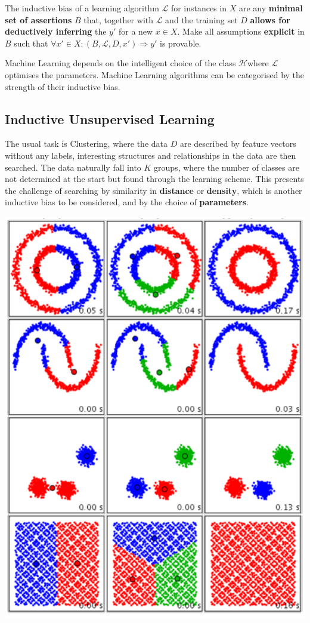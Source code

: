 \documentclass[11pt]{article}
\theoremstyle{definition}
\newcommand*\Hilbert{\ensuremath{\mathcal{H}}}
\begin{document}
The inductive bias of a learning algorithm $\mathcal{L}$ for instances in $X$ are any \textbf{minimal set of assertions} $B$ that, together with $\mathcal{L}$ and the training set $D$ \textbf{allows for deductively inferring} the $y'$ for a new $x\in X$. Make all assumptions \textbf{explicit} in $B$ such that $\forall x' \in X: \left(B, \mathcal{L}, D, x' \right) \Rightarrow y'$ is provable.

Machine Learning depends on the intelligent choice of the class \Hilbert where $\mathcal{L}$ optimises the parameters. Machine Learning algorithms can be categorised by the strength of their inductive bias.

\subsection{Inductive Unsupervised Learning}
\begin{minipage}{0.6\linewidth}
	The usual task is Clustering, where the data $D$ are described by feature vectors without any labels, interesting structures and relationships in the data are then searched. The data naturally fall into $K$ groups, where the number of classes are not determined at the start but found through the learning scheme. This presents the challenge of searching by similarity in \textbf{distance} or \textbf{density}, which is another inductive bias to be considered, and by the choice of \textbf{parameters}.
	
\end{minipage}
\begin{minipage}{0.4\linewidth}
	\begin{center}
		\includegraphics[width=0.6\linewidth]{img/clustering_example}
	\end{center}
\end{minipage}
\end{document}
